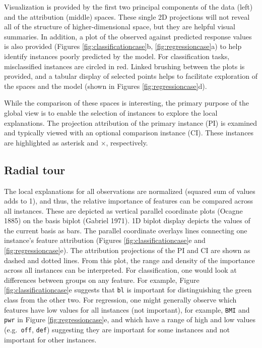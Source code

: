 \documentclass[
]{article}
\begin{document}
Visualization is provided by the first two principal components of the data (left) and the attribution (middle) spaces. These single 2D projections will not reveal all of the structure of higher-dimensional space, but they are helpful visual summaries. In addition, a plot of the observed against predicted response values is also provided (Figures \ref{fig:classificationcase}b, \ref{fig:regressioncase}a) to help identify instances poorly predicted by the model. For classification tasks, misclassified instances are circled in red. Linked brushing between the plots is provided, and a tabular display of selected points helps to facilitate exploration of the spaces and the model (shown in Figures \ref{fig:regressioncase}d).

While the comparison of these spaces is interesting, the primary purpose of the global view is to enable the selection of instances to explore the local explanations. The projection attribution of the primary instance (PI) is examined and typically viewed with an optional comparison instance (CI). These instances are highlighted as asterisk and \(\times\), respectively.

\hypertarget{radial-tour}{%
\subsection{Radial tour}\label{radial-tour}}

The local explanations for all observations are normalized (squared sum of values adds to 1), and thus, the relative importance of features can be compared across all instances. These are depicted as vertical parallel coordinate plots (Ocagne 1885) on the basis biplot (Gabriel 1971). 1D biplot display depicts the values of the current basis as bars. The parallel coordinate overlays lines connecting one instance's feature attribution (Figures \ref{fig:classificationcase}e and \ref{fig:regressioncase}e). The attribution projections of the PI and CI are shown as dashed and dotted lines. From this plot, the range and density of the importance across all instances can be interpreted. For classification, one would look at differences between groups on any feature. For example, Figure \ref{fig:classificationcase}e suggests that \texttt{bl} is important for distinguishing the green class from the other two. For regression, one might generally observe which features have low values for all instances (not important), for example, \texttt{BMI} and \texttt{pwr} in Figure \ref{fig:regressioncase}e, and which have a range of high and low values (e.g.~\texttt{off}, \texttt{def}) suggesting they are important for some instances and not important for other instances.
\end{document}
